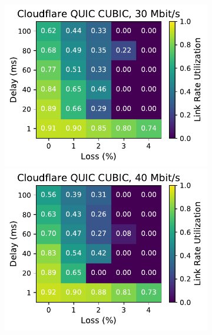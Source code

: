 \begin{figure}[ht]
\begin{subfigure}[b]{0.22\linewidth}
        \includegraphics[width=\linewidth,trim={0 0 2cm 0},clip]{splitting-paper/figures/heatmaps/heatmap_quiche_cubic_30mbps.pdf}
        \includegraphics[width=\linewidth,trim={0 0 2cm 0},clip]{splitting-paper/figures/heatmaps/heatmap_quiche_cubic_40mbps.pdf}

\end{subfigure}
\end{figure}
